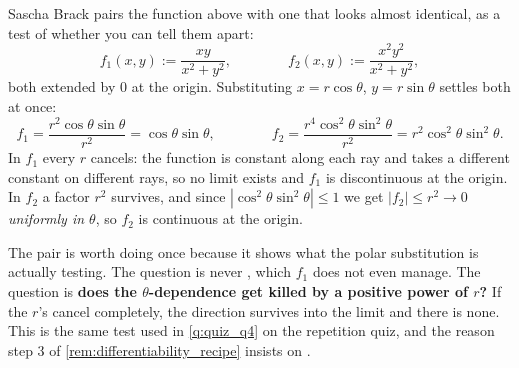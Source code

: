 \begin{remark}
\label{rem:continuity_contrast_pair}
Sascha Brack pairs the function above with one that looks almost identical, as a test of whether
you can tell them apart:
\[f_1(x,y) := \frac{xy}{x^2+y^2}, \qquad\qquad f_2(x,y) := \frac{x^2y^2}{x^2+y^2},\]
both extended by $0$ at the origin. Substituting $x = r\cos\theta$, $y = r\sin\theta$ settles
both at once:
\[f_1 = \frac{r^2\cos\theta\sin\theta}{r^2} = \cos\theta\sin\theta,
\qquad\qquad
f_2 = \frac{r^4\cos^2\theta\sin^2\theta}{r^2} = r^2\cos^2\theta\sin^2\theta.\]
In $f_1$ every $r$ cancels: the function is constant along each ray and takes a different
constant on different rays, so no limit exists and $f_1$ is discontinuous at the origin. In
$f_2$ a factor $r^2$ survives, and since $|\cos^2\theta\sin^2\theta| \leq 1$ we get
$|f_2| \leq r^2 \to 0$ \emph{uniformly in $\theta$}, so $f_2$ is continuous at the origin.

The pair is worth doing once because it shows what the polar substitution is actually testing.
The question is never , which $f_1$ does
not even manage. The question is \textbf{does the $\theta$-dependence get killed by a positive
power of $r$?} If the $r$'s cancel completely, the direction survives into the limit and there is
none.
This is the same test used in \cref{q:quiz_q4} on the repetition quiz, and the reason
step 3 of \cref{rem:differentiability_recipe} insists on .
\end{remark}

\begin{center}
\end{center}

